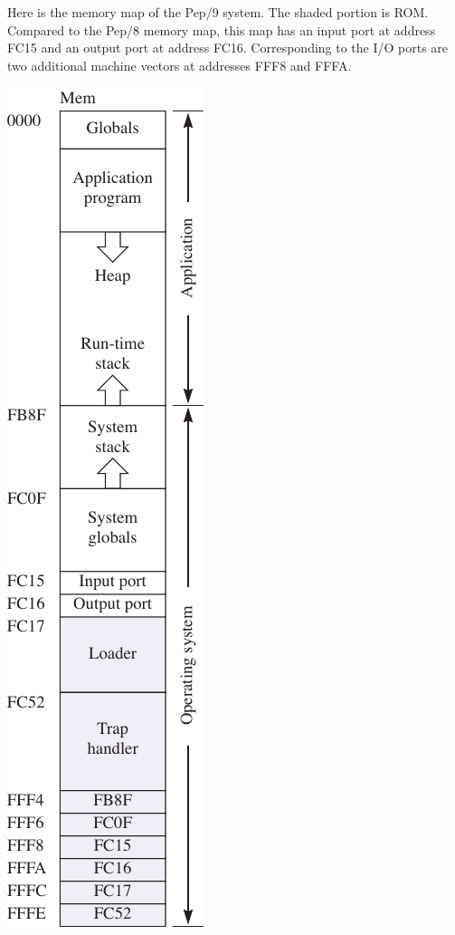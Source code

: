 \documentclass[10pt,fleqn]{book}
\begin{document}
\newpage

\noindent Here is the memory map of the Pep/9 system.
The shaded portion is ROM.
Compared to the Pep/8 memory map, this map has an input port at address FC15 and an output port at address FC16.
Corresponding to the I/O ports are two additional machine vectors at addresses FFF8 and FFFA.\\
\begin{center}
\includegraphics{memory-map.pdf}
\end{center}
\end{document}

